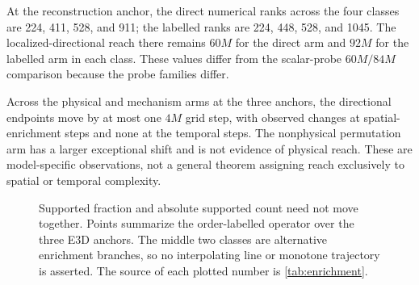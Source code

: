 At the reconstruction anchor, the direct numerical ranks across the four classes are 224, 411, 528, and 911; the labelled ranks are 224, 448, 528, and 1045. The localized-directional reach there remains $60M$ for the direct arm and $92M$ for the labelled arm in each class. These values differ from the scalar-probe $60M/84M$ comparison because the probe families differ.

Across the physical and mechanism arms at the three anchors, the directional endpoints move by at most one $4M$ grid step, with observed changes at spatial-enrichment steps and none at the temporal steps. The nonphysical permutation arm has a larger exceptional shift and is not evidence of physical reach. These are model-specific observations, not a general theorem assigning reach exclusively to spatial or temporal complexity.

\begin{figure}[htbp]
\centering
{}
\caption{Supported fraction and absolute supported count need not move together. Points summarize the order-labelled operator over the three E3D anchors. The middle two classes are alternative enrichment branches, so no interpolating line or monotone trajectory is asserted. The source of each plotted number is \cref{tab:enrichment}.}
\label{fig:enrichment}
\end{figure}
\FloatBarrier
